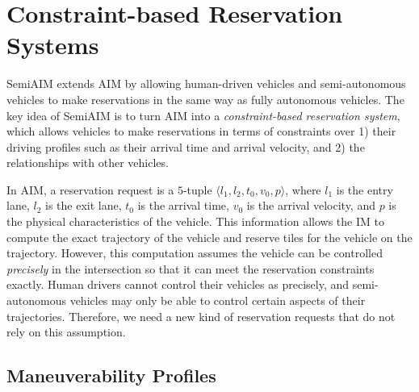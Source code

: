 \section{Constraint-based Reservation Systems}
\label{sec:constraint}

SemiAIM extends AIM by allowing human-driven vehicles and
semi-autonomous vehicles to make reservations in the same way as
fully autonomous vehicles.  The key idea of SemiAIM is to turn AIM into a
\emph{constraint-based reservation system}, which allows vehicles to
make reservations in terms of constraints over 1) their driving
profiles such as their arrival time and arrival velocity, and 2) the
relationships with other vehicles.

In AIM, a reservation request is a $5$-tuple $\langle l_1, l_2, t_0,
v_0, p\rangle$, where $l_1$ is the entry lane, $l_2$ is the exit lane,
$t_0$ is the arrival time, $v_0$ is the arrival velocity, and $p$ is
the physical characteristics of the vehicle.  This information allows
the IM to compute the exact trajectory of the vehicle and reserve
tiles for the vehicle on the trajectory.  However, this computation
assumes the vehicle can be controlled \emph{precisely} in the
intersection so that it can meet the reservation constraints exactly.
Human drivers cannot control their vehicles as precisely, and
semi-autonomous vehicles may only be able to control certain aspects
of their trajectories.  Therefore, we need a new kind of reservation
requests that do not rely on this assumption.

\subsection{Maneuverability Profiles} 

